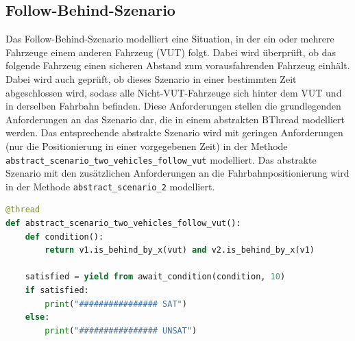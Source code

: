 \subsection{Follow-Behind-Szenario}
Das Follow-Behind-Szenario modelliert eine Situation, in der ein oder mehrere Fahrzeuge einem anderen Fahrzeug (VUT) folgt. Dabei wird überprüft, ob das folgende Fahrzeug einen sicheren Abstand zum vorausfahrenden Fahrzeug einhält.
Dabei wird auch geprüft, ob dieses Szenario in einer bestimmten Zeit abgeschlossen wird, sodass alle Nicht-VUT-Fahrzeuge sich hinter dem VUT und in derselben Fahrbahn befinden.
Diese Anforderungen stellen die grundlegenden Anforderungen an das Szenario dar, die in einem abstrakten BThread modelliert werden. Das entsprechende abstrakte Szenario wird mit geringen Anforderungen (nur die Positionierung in einer vorgegebenen Zeit) in der Methode \texttt{abstract\_scenario\_two\_vehicles\_follow\_vut} modelliert.
Das abstrakte Szenario mit den zusätzlichen Anforderungen an die Fahrbahnpositionierung wird in der Methode \texttt{abstract\_scenario\_2} modelliert.
\begin{lstlisting}[language=Python, caption=Abstraktes Szenario: Zwei Fahrzeuge folgen dem VUT, basicstyle=\ttfamily\small]
@thread
def abstract_scenario_two_vehicles_follow_vut():
    def condition():
        return v1.is_behind_by_x(vut) and v2.is_behind_by_x(v1)

    satisfied = yield from await_condition(condition, 10)
    if satisfied:
        print("################ SAT")
    else:
        print("################ UNSAT")
\end{lstlisting}

